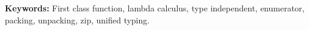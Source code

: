 


\textbf{Keywords:} First class function, lambda calculus, type independent, enumerator, packing, unpacking, zip, unified typing.